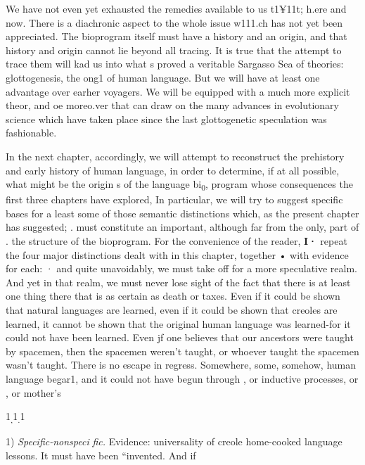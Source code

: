 We have not even yet exhausted the remedies available to us t1¥11t; h.ere and now. There is a diachronic aspect to the whole issue w111.ch has not yet been appreciated. The bioprogram itself must have a history and an origin, and that history and origin cannot lie beyond all tracing. It is true that the attempt to trace them will kad us into what s proved a veritable Sargasso Sea of theories: glottogenesis, the ong1 of human language. But we will have at least one advantage over earher voyagers. We will be equipped with a much more explicit theor, and oe moreo.ver that can draw on the many advances in
evolutionary science which have taken place since the last  glotto\-genetic speculation was fashionable.

In the next chapter, accordingly, we will attempt to reconstruct the prehistory and early history of human language, in order to deter\-mine, if at all possible, what might be the origin s of the language bi\textsubscript{0}, program whose consequences the first three chapters have explored, In particular, we will try to suggest specific bases for a least some of those semantic distinctions which, as the present chapter has suggested; . must constitute an important, although far from the only, part of . the structure of the bioprogram. For the convenience of the reader, \textbf{I·} repeat the four major distinctions dealt with in this chapter, together • with evidence for each: ·
and quite unavoidably, we must take off for a more speculative realm. And yet in that realm, we must never lose sight of the fact that there is at least one thing there that is as certain as death or taxes. Even if it could be shown that natural languages are learned, even if it could
be shown that creoles are learned, it cannot be shown that the original human language was learned{}-for it could not have been learned. Even jf one believes that our ancestors were taught by spacemen, then the spacemen weren't taught, or whoever taught the spacemen wasn't taught. There is no escape in regress. Somewhere, some, somehow, human language begar1, and it could not have begun through , or inductive processes, or , or mother's

1\textsubscript{,}1\textsubscript{.}1

1) \textit{S}\textit{pec}\textit{i}\textit{fic-nonspeci} \textit{fic. }Evidence: universality of creole home-cooked language lessons. It must have been ``invented. And if

